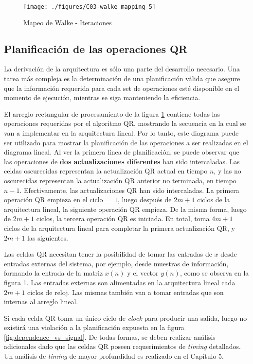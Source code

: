 \newpage

\begin{figure}[h!]
     \centering
     \texttt{[image: ./figures/C03-walke\_mapping\_5]}
     \caption{Mapeo de Walke - Iteraciones}
     \label{fig:walke_mapping_5}
\end{figure}

\subsection{Planificación de las operaciones QR}

La derivación de la arquitectura es sólo una parte del desarrollo necesario. Una tarea más compleja es la determinación de una planificación válida que asegure que la información requerida para cada set de operaciones esté disponible en el momento de ejecución, mientras se siga manteniendo la eficiencia.

El arreglo rectangular de procesamiento de la figura \ref{fig:walke_mapping_5} contiene todas las operaciones requeridas por el algoritmo QR, mostrando la secuencia en la cual se van a implementar en la arquitectura lineal. Por lo tanto, este diagrama puede ser utilizado para mostrar la planificación de las operaciones a ser realizadas en el diagrama lineal. Al ver la primera línea de planificación, se puede observar que las operaciones de \textbf{dos actualizaciones diferentes} han sido intercaladas. Las celdas oscurecidas representan la actualización QR actual en tiempo $n$, y las no oscurecidas representan la actualización QR anterior no terminada, en tiempo $n-1$. Efectivamente, las actualizaciones QR han sido intercaladas. La primera operación QR empieza en el ciclo $= 1$, luego después de $2m + 1$ ciclos de la arquitectura lineal, la siguiente operación QR empieza. De la misma forma, luego de $2m + 1$ ciclos, la tercera operación QR es iniciada. En total, toma $4m + 1$ ciclos de la arquitectura lineal para completar la primera actualización QR, y $2m + 1$ las siguientes.

Las celdas QR necesitan tener la posibilidad de tomar las entradas de $x$ desde entradas externas del sistema, por ejemplo, desde muestras de información, formando la entrada de la matriz $x(n)$ y el vector $y(n)$, como se observa en la figura \ref{fig:walke_mapping_5}. Las entradas externas son alimentadas en la arquitectura lineal cada $2m + 1$ ciclos de reloj. Las mismas también van a tomar entradas que son internas al arreglo lineal.

Si cada celda QR toma un único ciclo de \textit{clock} para producir una salida, luego no existirá una violación a la planificación expuesta en la figura \ref{fig:dependence_vs_signal}. De todas formas, se deben realizar análisis adicionales dado que las celdas QR poseen requerimientos de \textit{timing} detallados. Un análisis de \textit{timing} de mayor profundidad es realizado en el Capítulo 5.

